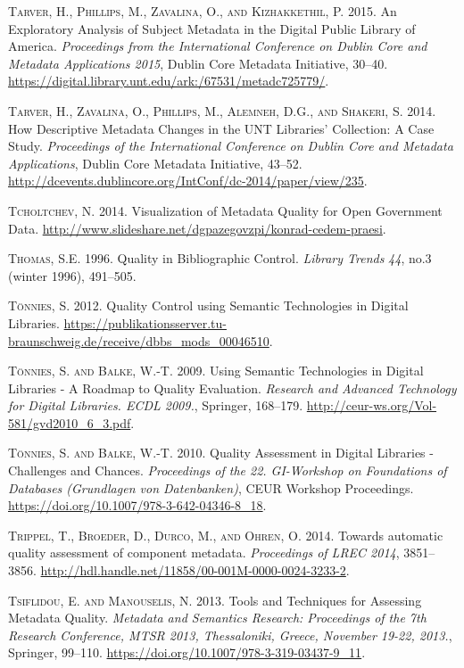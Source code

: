 \textsc{Tarver, H., Phillips, M., Zavalina, O., and Kizhakkethil, P.} 2015. An Exploratory Analysis of Subject Metadata in the Digital Public Library of America. \emph{Proceedings from the International Conference on Dublin Core and Metadata Applications 2015}, Dublin Core Metadata Initiative, 30–40. \url{https://digital.library.unt.edu/ark:/67531/metadc725779/}.

\textsc{Tarver, H., Zavalina, O., Phillips, M., Alemneh, D.G., and Shakeri, S.} 2014. How Descriptive Metadata Changes in the UNT Libraries’ Collection: A Case Study. \emph{Proceedings of the International Conference on Dublin Core and Metadata Applications}, Dublin Core Metadata Initiative, 43–52. \url{http://dcevents.dublincore.org/IntConf/dc-2014/paper/view/235}.

\textsc{Tcholtchev, N.} 2014. Visualization of Metadata Quality for Open Government Data. \url{http://www.slideshare.net/dgpazegovzpi/konrad-cedem-praesi}.

\textsc{Thomas, S.E.} 1996. Quality in Bibliographic Control. \emph{Library Trends} \emph{44}, no.3 (winter 1996), 491–505.

\textsc{Tönnies, S.} 2012. Quality Control using Semantic Technologies in Digital Libraries. \url{https://publikationsserver.tu-braunschweig.de/receive/dbbs_mods_00046510}.

\textsc{Tönnies, S. and Balke, W.-T.} 2009. Using Semantic Technologies in Digital Libraries - A Roadmap to Quality Evaluation. \emph{Research and Advanced Technology for Digital Libraries. ECDL 2009.}, Springer, 168–179. \url{http://ceur-ws.org/Vol-581/gvd2010_6_3.pdf}.

\textsc{Tönnies, S. and Balke, W.-T.} 2010. Quality Assessment in Digital Libraries - Challenges and Chances. \emph{Proceedings of the 22. GI-Workshop on Foundations of Databases (Grundlagen von Datenbanken)}, CEUR Workshop Proceedings. \url{https://doi.org/10.1007/978-3-642-04346-8_18}.

\textsc{Trippel, T., Broeder, D., Durco, M., and Ohren, O.} 2014. Towards automatic quality assessment of component metadata. \emph{Proceedings of LREC 2014}, 3851–3856. \url{http://hdl.handle.net/11858/00-001M-0000-0024-3233-2}.

\textsc{Tsiflidou, E. and Manouselis, N.} 2013. Tools and Techniques for Assessing Metadata Quality. \emph{Metadata and Semantics Research: Proceedings of the 7th Research Conference, MTSR 2013, Thessaloniki, Greece, November 19-22, 2013.}, Springer, 99–110. \url{https://doi.org/10.1007/978-3-319-03437-9_11}.

